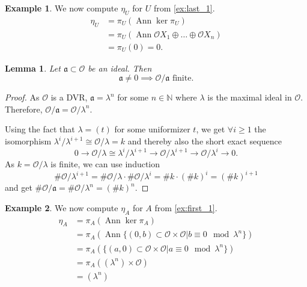 \documentclass{article}
\theoremstyle{plain}%
\newtheorem{lemma}{Lemma}[section]
\theoremstyle{definition}
\newtheorem{example}{Example}[section]
\theoremstyle{remark}
\newcommand{\ann}{\operatorname{Ann}}
\begin{document}
\begin{example}
    We now compute \(\eta_U\) for \(U\) from \cref{ex:last_1}.
    \begin{align*}
        \eta_U &= \pi_U(\ann \ker \pi_U)\\
        &= \pi_U(\ann \mathcal{O}X_1 \oplus \dots \oplus \mathcal{O}X_n)\\
        &= \pi_U(0) = 0.
    \end{align*}
\end{example}

\begin{lemma}\label{lem:ideals}
    Let \(\mathfrak a \subset \mathcal{O}\) be an ideal. Then
    \[\mathfrak a \neq 0 \implies \mathcal{O}/\mathfrak a \text{ finite}.\]
\end{lemma}
\begin{proof}
    As \(\mathcal{O}\) is a DVR, \(\mathfrak a = \lambda^n\) for some \(n \in \mathbb N\) 
    where \(\lambda\) is the maximal ideal in \(\mathcal{O}\).
    Therefore, \(\mathcal{O}/\mathfrak{a} = \mathcal{O}/\lambda^n.\)

    Using the fact that \(\lambda = (t)\) for some uniformizer \(t\), we get \(\forall i \ge 1\) 
    the isomorphism \(\lambda^i/\lambda^{i+1} \cong \mathcal{O}/\lambda = k\) and thereby also the short exact sequence 
    \[0 \to \mathcal{O}/\lambda \cong \lambda^i/\lambda^{i+1} \to \mathcal{O}/\lambda^{i+1} \to \mathcal{O}/\lambda^{i} \to 0.\]
    As \(k = \mathcal{O}/\lambda\) is finite, we can use induction
    \[\# \mathcal{O}/\lambda^{i+1} = \# \mathcal{O}/\lambda \cdot \# \mathcal{O}/\lambda^i = \# k \cdot (\# k)^i = (\# k)^{i+1}\]
    and get \(\# \mathcal{O}/\mathfrak{a} = \# \mathcal{O}/\lambda^n = (\# k)^n\).
\end{proof}

\begin{example}\label{ex:first_eta}
    We now compute \(\eta_A\) for \(A\) from \cref{ex:first_1}.
    \begin{align*}
        \eta_A &= \pi_A(\ann \ker \pi_A)\\
        &= \pi_A(\ann \{(0, b) \subset \mathcal{O}\times \mathcal{O} | b \equiv 0 \mod \lambda^n\})\\
        &= \pi_A(\{(a, 0) \subset \mathcal{O}\times \mathcal{O} | a \equiv 0 \mod \lambda^n\})\\
        &= \pi_A((\lambda^n) \times \mathcal{O})\\
        &= (\lambda^n)
    \end{align*}
\end{example}
\end{document}
